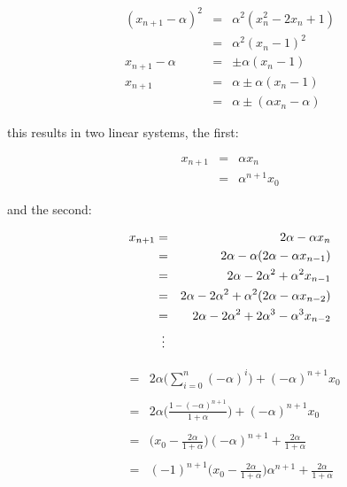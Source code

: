 \documentclass{report}
\begin{document}
\begin{eqnarray*}
    (x_{n + 1} - \alpha)^2 & = & \alpha^2 (x_n^2 -2 x_n + 1) \\
                           & = & \alpha^2 (x_n - 1)^2 \\
        x_{n + 1} - \alpha & = & \pm \alpha (x_n - 1) \\
                 x_{n + 1} & = & \alpha \pm \alpha (x_n - 1) \\
                           & = & \alpha \pm (\alpha x_n - \alpha)
\end{eqnarray*}\medskip

this results in two linear systems, the first: \bigskip

\begin{eqnarray*}
    x_{n + 1} & = & \alpha x_n \\
              & = & \alpha^{n + 1} x_0
\end{eqnarray*}\medskip

and the second: \bigskip

\begin{eqnarray*}
    x_{n + 1} & = & 2 \alpha - \alpha x_n \\
              & = & 2 \alpha - \alpha (2 \alpha - \alpha x_{n - 1}) \\
              & = & 2 \alpha - 2 \alpha^2 + \alpha^2 x_{n - 1} \\
              & = & 2 \alpha - 2 \alpha^2 + \alpha^2 (2 \alpha - \alpha x_{n - 2}) \\
              & = & 2 \alpha - 2 \alpha^2 + 2 \alpha^3 - \alpha^3 x_{n - 2} \\
              & \mathrel{\makebox[\widthof{=}]{\vdots}} \\
\end{eqnarray*}

\begin{eqnarray*}
              & = & 2 \alpha \Big( \sum_{i = 0}^{n} (- \alpha)^i \Big) + (- \alpha)^{n + 1} x_0 \\\\
              & = & 2 \alpha \Big( \frac{1 - (- \alpha)^{n + 1}}{1 + \alpha} \Big) + (- \alpha)^{n + 1} x_0 \\\\
              & = & \Big( x_0 - \frac{2 \alpha}{1 + \alpha} \Big) (- \alpha)^{n + 1} + \frac{2 \alpha}{1 + \alpha} \\\\
              & = & (-1)^{n + 1} \Big( x_0 - \frac{2 \alpha}{1 + \alpha} \Big) \alpha^{n + 1} + \frac{2 \alpha}{1 + \alpha}
\end{eqnarray*}\medskip
\end{document}
